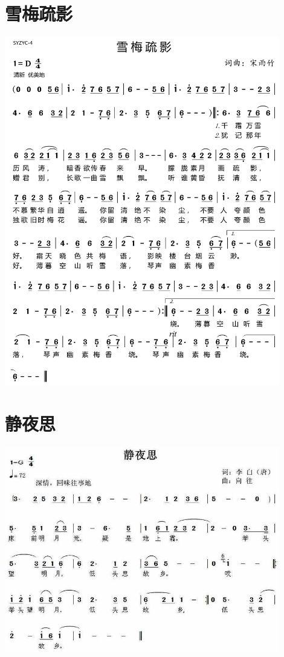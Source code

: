 \documentclass[cn,pad,twocol]{elegantbook}
\begin{document}
\section{雪梅疏影}              \includegraphics[width=0.9\textwidth]{dongxiao/20200725-雪梅疏影}
\section{静夜思}                \includegraphics[width=0.9\textwidth]{dongxiao/20200411-静夜思}
\end{document}
